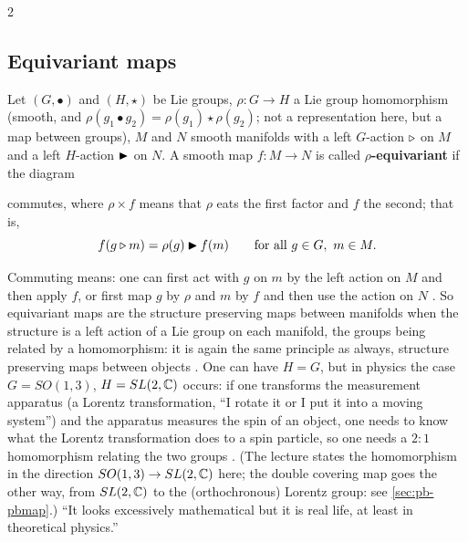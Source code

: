 \begin{paracol}{2}
\subsection{Equivariant maps}\label{sec:pb-equivariant}
\begin{definition}\label{def:pb-equivariant}
Let $(G,\bullet)$ and $(H,\star)$ be Lie groups, $\rho\colon G\to H$ a Lie group homomorphism (smooth, and $\rho(g_1\bullet g_2)=\rho(g_1)\star\rho(g_2)$; not a representation here, but a map between groups), $M$ and $N$ smooth manifolds with a left $G$-action $\mathbin{\triangleright}$ on $M$ and a left $H$-action $\mathbin{\blacktriangleright}$ on $N$. A smooth map $f\colon M\to N$ is called \textbf{$\rho$-equivariant} if the diagram
\begin{center}
\end{center}
commutes, where $\rho\times f$ means that $\rho$ eats the first factor and $f$ the second; that is,
\[
  f(g\mathbin{\triangleright} m)=\rho(g)\mathbin{\blacktriangleright} f(m)\qquad\text{for all }g\in G,\ m\in M .
\]
              
\end{definition}
Commuting means: one can first act with $g$ on $m$ by the left action on $M$ and then apply $f$, or first map $g$ by $\rho$ and $m$ by $f$ and then use the action on $N$  . So equivariant maps are the structure preserving maps between manifolds when the structure is a left action of a Lie group on each manifold, the groups being related by a homomorphism: it is again the same principle as always, structure preserving maps between objects   . One can have $H=G$, but in physics the case $G=SO(1,3)$, $H=SL(2,\mathbb{C})$ occurs: if one transforms the measurement apparatus (a Lorentz transformation, ``I rotate it or I put it into a moving system'') and the apparatus measures the spin of an object, one needs to know what the Lorentz transformation does to a spin particle, so one needs a $2:1$ homomorphism relating the two groups    . (The lecture states the homomorphism in the direction $SO(1,3)\to SL(2,\mathbb{C})$ here; the double covering map goes the other way, from $SL(2,\mathbb{C})$ to the (orthochronous) Lorentz group: see \cref{sec:pb-pbmap}.) ``It looks excessively mathematical but it is real life, at least in theoretical physics.''


\end{paracol}
